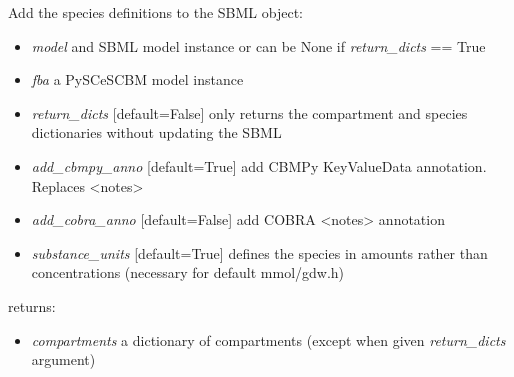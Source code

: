 \documentclass[a4paper,11pt,english]{sphinxmanual}
\begin{document}

\begin{fulllineitems}
\label{modules_doc:cbmpy.CBXML.sbml_setSpeciesL3}
Add the species definitions to the SBML object:
\begin{itemize}
\item {} 
\emph{model} and SBML model instance or can be None if \emph{return\_dicts} == True

\item {} 
\emph{fba} a PySCeSCBM model instance

\item {} 
\emph{return\_dicts} {[}default=False{]} only returns the compartment and species dictionaries without updating the SBML

\item {} 
\emph{add\_cbmpy\_anno} {[}default=True{]} add CBMPy KeyValueData annotation. Replaces \textless{}notes\textgreater{}

\item {} 
\emph{add\_cobra\_anno} {[}default=False{]} add COBRA \textless{}notes\textgreater{} annotation

\item {} 
\emph{substance\_units} {[}default=True{]} defines the species in amounts rather than concentrations (necessary for default mmol/gdw.h)

\end{itemize}

returns:
\begin{itemize}
\item {} 
\emph{compartments} a dictionary of compartments (except when given \emph{return\_dicts} argument)

\end{itemize}

\end{fulllineitems}

\end{document}
